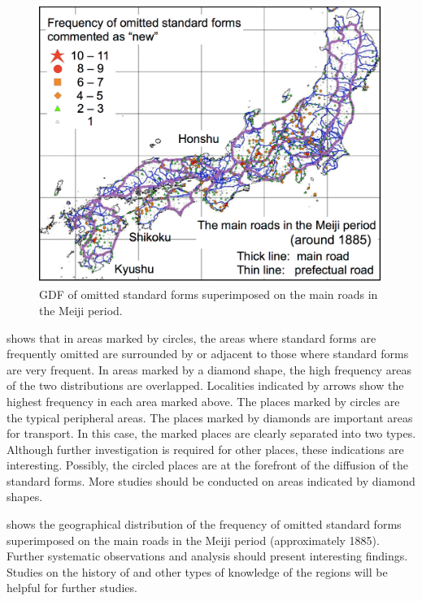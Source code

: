 \documentclass[output=paper]{LSP/langsci}
\begin{document}
\begin{figure}[b]
\includegraphics[height=.4\textheight]{illustrations/kuma_fig19}
\caption{GDF of omitted standard forms superimposed on the main roads in the Meiji period.}          
\label{fig:19}
\end{figure}             

 shows that in areas marked by circles, the areas where standard forms are frequently omitted are surrounded by or adjacent to those where standard forms are very frequent. In areas marked by a diamond shape, the high frequency areas of the two distributions are overlapped. Localities indicated by arrows show the highest frequency in each area marked above. The places marked by circles are the typical peripheral areas. The places marked by diamonds are important areas for transport. In this case, the marked places are clearly separated into two types. Although further investigation is required for other places, these indications are interesting. Possibly, the circled places are at the forefront of the diffusion of the standard forms. More studies should be conducted on areas indicated by diamond shapes.

 shows the geographical distribution of the frequency of omitted standard forms superimposed on the main roads in the Meiji period (approximately 1885). Further systematic observations and analysis should present interesting findings. Studies on the history of  and other types of knowledge of the regions will be helpful for further studies.
\end{document}
